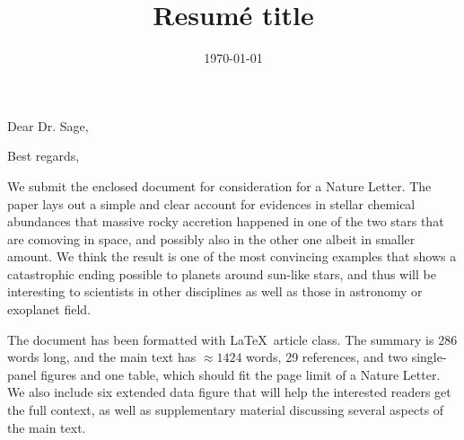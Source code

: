 \documentclass[12pt,letter,roman]{moderncv}
\title{Resumé title}
\begin{document}
\date{\today}
\opening{Dear Dr. Sage,}
\closing{Best regards,}
\makelettertitle

We submit the enclosed document for consideration for a Nature Letter.
The paper lays out a simple and clear account for evidences in stellar
chemical abundances that massive rocky accretion happened in one of the two
stars that are comoving in space, and possibly also in the other one albeit in
smaller amount.
We think the result is one of the most convincing examples that shows a
catastrophic ending possible to planets around sun-like stars, and thus will be
interesting to scientists in other disciplines as well as those in astronomy or
exoplanet field.

The document has been formatted with \LaTeX\ article class.
The summary is 286 words long, and the main text has $\approx 1424$ words,
29 references,
and two single-panel figures and one table, which should fit the page limit
of a Nature Letter.
We also include six extended data figure that will help the interested readers
get the full context, as well as supplementary material discussing several
aspects of the main text.

\vspace{0.5cm}


\makeletterclosing
\end{document}
